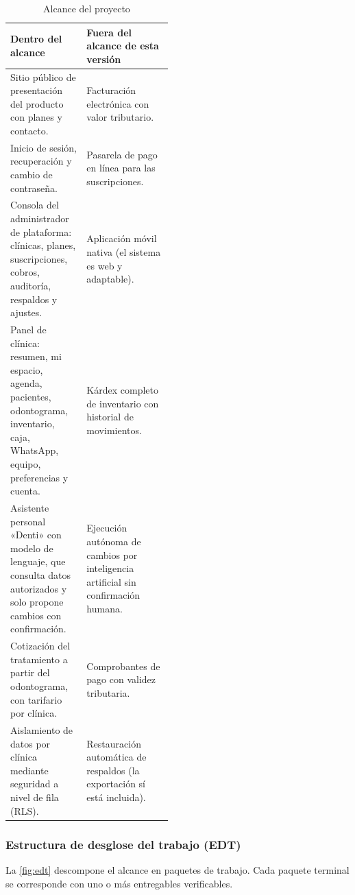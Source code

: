 \documentclass[11pt]{article}
\begin{document}
\begin{table}[H]
\centering\small
\caption{Alcance del proyecto}\label{tab:alcance}
\begin{tabularx}{\linewidth}{@{}P{0.47\linewidth}L@{}}
\toprule
\textbf{Dentro del alcance} & \textbf{Fuera del alcance de esta versión} \\
\midrule
Sitio público de presentación del producto con planes y contacto. &
Facturación electrónica con valor tributario. \\
Inicio de sesión, recuperación y cambio de contraseña. &
Pasarela de pago en línea para las suscripciones. \\
Consola del administrador de plataforma: clínicas, planes, suscripciones, cobros, auditoría, respaldos y ajustes. &
Aplicación móvil nativa (el sistema es web y adaptable). \\
Panel de clínica: resumen, mi espacio, agenda, pacientes, odontograma, inventario, caja, WhatsApp, equipo, preferencias y cuenta. &
Kárdex completo de inventario con historial de movimientos. \\
Asistente personal «Denti» con modelo de lenguaje, que consulta datos autorizados y solo propone cambios con confirmación. &
Ejecución autónoma de cambios por inteligencia artificial sin confirmación humana. \\
Cotización del tratamiento a partir del odontograma, con tarifario por clínica. &
Comprobantes de pago con validez tributaria. \\
Aislamiento de datos por clínica mediante seguridad a nivel de fila (RLS). &
Restauración automática de respaldos (la exportación sí está incluida). \\
\bottomrule
\end{tabularx}
\end{table}

\subsubsection*{Estructura de desglose del trabajo (EDT)}

La \cref{fig:edt} descompone el alcance en paquetes de trabajo. Cada paquete terminal se corresponde con uno o más entregables verificables.
\end{document}
